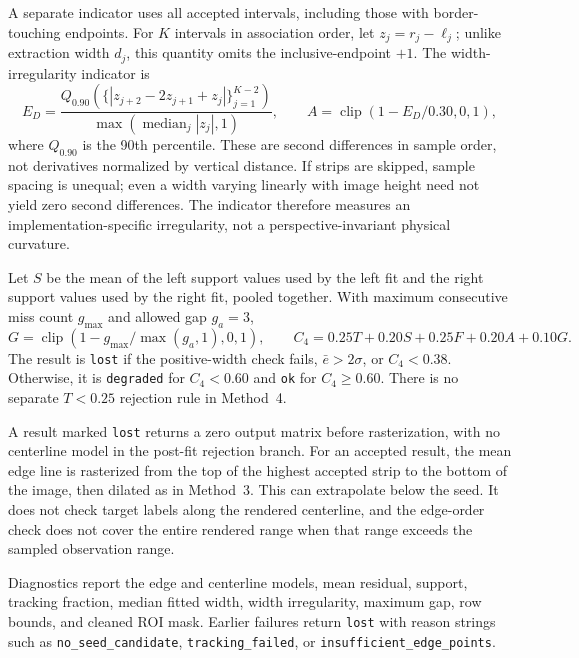A separate indicator uses all accepted intervals, including those with
border-touching endpoints. For $K$ intervals in association order, let
$z_j=r_j-\ell_j$; unlike extraction width $d_j$, this quantity omits the
inclusive-endpoint $+1$. The width-irregularity indicator is
\begin{equation}
    E_D=\frac{Q_{0.90}\left(\{|z_{j+2}-2z_{j+1}+z_j|\}_{j=1}^{K-2}\right)}
                   {\max(\operatorname{median}_j|z_j|,1)},
    \qquad A=\operatorname{clip}(1-E_D/0.30,0,1),
    \label{eq:c4_width_score}
\end{equation}
where $Q_{0.90}$ is the 90th percentile. These are second differences in
sample order, not derivatives normalized by vertical distance. If strips
are skipped, sample spacing is unequal; even a width varying linearly
with image height need not yield zero second differences. The indicator
therefore measures an implementation-specific irregularity, not a
perspective-invariant physical curvature.

Let $S$ be the mean of the left support values used by the left fit and
the right support values used by the right fit, pooled together. With
maximum consecutive miss count $g_{\max}$ and allowed gap $g_a=3$,
\begin{equation}
    G=\operatorname{clip}(1-g_{\max}/\max(g_a,1),0,1),\qquad
    C_4=0.25T+0.20S+0.25F+0.20A+0.10G.
    \label{eq:c4_confidence4}
\end{equation}
The result is \texttt{lost} if the positive-width check fails,
$\bar e>2\sigma$, or $C_4<0.38$. Otherwise, it is \texttt{degraded}
for $C_4<0.60$ and \texttt{ok} for $C_4\geq0.60$.
There is no separate $T<0.25$ rejection rule in Method~4.

A result marked \texttt{lost} returns a zero output matrix before
rasterization, with no centerline model in the post-fit rejection branch.
For an accepted result, the mean edge line is rasterized from the top of
the highest accepted strip to the bottom of the image, then dilated as
in Method~3. This can extrapolate below the seed. It does not check target
labels along the rendered centerline, and the edge-order check does not
cover the entire rendered range when that range exceeds the sampled
observation range.

Diagnostics report the edge and centerline models, mean residual,
support, tracking fraction, median fitted width, width irregularity,
maximum gap, row bounds, and cleaned ROI mask. Earlier failures return
\texttt{lost} with reason strings such as \texttt{no\_seed\_candidate},
\texttt{tracking\_failed}, or \texttt{insufficient\_edge\_points}.

